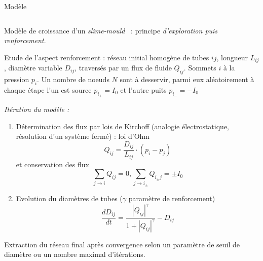 \documentclass{beamer}
\begin{document}
\begin{frame}{}
\begin{columns}[t]
\begin{column}{.49\textwidth}
         \begin{block}{Modèle}
        \begin{columns}[t]
        \begin{column}{.95\textwidth}
        \vspace{-2cm}
        \begin{justify}
          Modèle de croissance d'un \emph{slime-mould}~\cite{tero2010rules} : principe \emph{d'exploration puis renforcement}.
          
          \bigskip
          
          Etude de l'aspect renforcement : réseau initial homogène de tubes $ij$, longueur $L_{ij}$, diamètre variable $D_{ij}$, traversés par un flux de fluide $Q_{ij}$. Sommets $i$ à la pression $p_i$. Un nombre de noeuds $N$ sont à desservir, parmi eux aléatoirement à chaque étape l'un est source $p_{i_+}=I_0$ et l'autre puits $p_{i_-}=-I_0$
          
          
          \bigskip
          \textit{Itération du modèle :}
          \begin{enumerate}
          \item Détermination des flux par lois de Kirchoff (analogie électrostatique, résolution d'un système fermé) : loi d'Ohm
          \begin{equation}
Q_{ij}=\frac{D_{ij}}{L_{ij}}\cdot(p_{i}-p_{j})
\end{equation}
et conservation des flux
\begin{equation}
\sum_{j\rightarrow i}Q_{ij} = 0 , \sum_{j\rightarrow i_\pm}Q_{i_{\pm}j} = \pm I_0
\end{equation}



\item Evolution du diamètres de tubes ($\gamma$ paramètre de renforcement)
\begin{equation}
\frac{dD_{ij}}{dt}=\frac{\left|Q_{ij}\right|^{\gamma}}{1+\left|Q_{ij}\right|^{\gamma}}-D_{ij}
\end{equation}
          \end{enumerate}

\bigskip

Extraction du réseau final après convergence selon un paramètre de seuil de diamètre ou un nombre maximal d'itérations.



\end{justify}
\end{column}
\end{columns}
\end{block}
\end{column}
\end{columns}
\end{frame}
\end{document}
